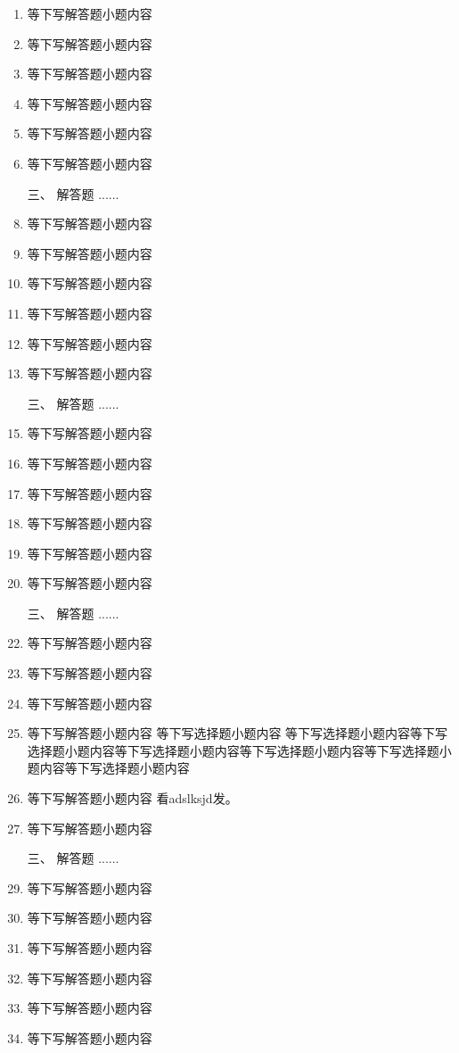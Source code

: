 \documentclass[12pt,twocolumn,landscape,UTF8,twoside]{ctexart}
\begin{document}
\begin{spacing}{1.3}
\begin{enumerate} [1、]
		\item 等下写解答题小题内容 
		\item 等下写解答题小题内容 
		\item 等下写解答题小题内容 
		\item 等下写解答题小题内容 
		\item 等下写解答题小题内容 
		\item 等下写解答题小题内容  		
		\item[\heiti 三、] {\heiti 解答题  ......}
		\item 等下写解答题小题内容 
		\item 等下写解答题小题内容 
		\item 等下写解答题小题内容 
		\item 等下写解答题小题内容 
		\item 等下写解答题小题内容 
		\item 等下写解答题小题内容  		
		\item[\heiti 三、] {\heiti 解答题  ......}
		\item 等下写解答题小题内容 
		\item 等下写解答题小题内容 
		\item 等下写解答题小题内容 
		\item 等下写解答题小题内容 
		\item 等下写解答题小题内容 
		\item 等下写解答题小题内容  		
		\item[\heiti 三、] {\heiti 解答题  ......}
		\item 等下写解答题小题内容 
		\item 等下写解答题小题内容 
		\item 等下写解答题小题内容 
		\item 等下写解答题小题内容 等下写选择题小题内容 等下写选择题小题内容等下写选择题小题内容等下写选择题小题内容等下写选择题小题内容等下写选择题小题内容等下写选择题小题内容
		\item 等下写解答题小题内容 \tk[2] 看adslksjd发。
		\item 等下写解答题小题内容  		
		\item[\heiti 三、] {\heiti 解答题  ......}
		\item 等下写解答题小题内容 
		\item 等下写解答题小题内容 
		\item 等下写解答题小题内容 
		\item 等下写解答题小题内容 
		\item 等下写解答题小题内容 
		\item 等下写解答题小题内容  		

\end{enumerate}
\end{spacing}
\end{document}

